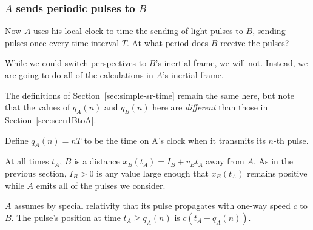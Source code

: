 \documentclass[a4paper]{article}
\theoremstyle{plain}
\theoremstyle{definition}
\begin{document}
\subsubsection{$A$ sends periodic pulses to $B$}
\label{sec:scen1AtoB}

Now $A$ uses his local clock to time the sending of light pulses to $B$,
sending pulses once every time interval $T$.
At what period does $B$ receive the pulses?

While we could switch perspectives to $B$'s inertial frame, we will
not.  Instead, we are going to do all of the calculations in $A$'s
inertial frame.

The definitions of Section~\ref{sec:simple-sr-time} remain the same here, but note
that the values of $q_A(n)$ and $q_B(n)$ here are {\em different} than
those in Section~\ref{sec:scen1BtoA}.

Define $q_A(n) = nT$ to be the time on A's clock when it transmits its
$n$-th pulse.

At all times $t_A$, $B$ is a distance $x_B(t_A) = I_B + v_B t_A$ away from $A$.
As in the previous section, $I_B > 0$ is any value large enough
that $x_B(t_A)$ remains positive while $A$ emits all of the pulses we consider.

$A$ assumes by special relativity that its pulse propagates with one-way
speed $c$ to $B$.  The pulse's position at time $t_A \geq q_A(n)$ is
$c(t_A - q_A(n))$.
\end{document}

